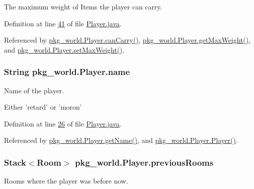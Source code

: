 The maximum weight of Items the player can carry. 



Definition at line \hyperlink{Player_8java_source_l00041}{41} of file \hyperlink{Player_8java_source}{Player.\-java}.



Referenced by \hyperlink{Player_8java_source_l00194}{pkg\-\_\-world.\-Player.\-can\-Carry()}, \hyperlink{Player_8java_source_l00089}{pkg\-\_\-world.\-Player.\-get\-Max\-Weight()}, and \hyperlink{Player_8java_source_l00097}{pkg\-\_\-world.\-Player.\-set\-Max\-Weight()}.

\hypertarget{classpkg__world_1_1Player_ab4c41ebebb7fcc55fa253e48af0c4267}{
\subsubsection[{name}]{\setlength{\rightskip}{0pt plus 5cm}String pkg\-\_\-world.\-Player.\-name\hspace{0.3cm}{\ttfamily [private]}}}\label{classpkg__world_1_1Player_ab4c41ebebb7fcc55fa253e48af0c4267}


Name of the player. 

Either 'retard' or 'moron' 

Definition at line \hyperlink{Player_8java_source_l00026}{26} of file \hyperlink{Player_8java_source}{Player.\-java}.



Referenced by \hyperlink{Player_8java_source_l00081}{pkg\-\_\-world.\-Player.\-get\-Name()}, and \hyperlink{Player_8java_source_l00068}{pkg\-\_\-world.\-Player.\-Player()}.

\hypertarget{classpkg__world_1_1Player_a28f9bc6a3c1d829996e8a38935b77fd1}{
\subsubsection[{previous\-Rooms}]{\setlength{\rightskip}{0pt plus 5cm}Stack$<${\bf Room}$>$ pkg\-\_\-world.\-Player.\-previous\-Rooms\hspace{0.3cm}{\ttfamily [private]}}}\label{classpkg__world_1_1Player_a28f9bc6a3c1d829996e8a38935b77fd1}


Rooms where the player was before now. 



